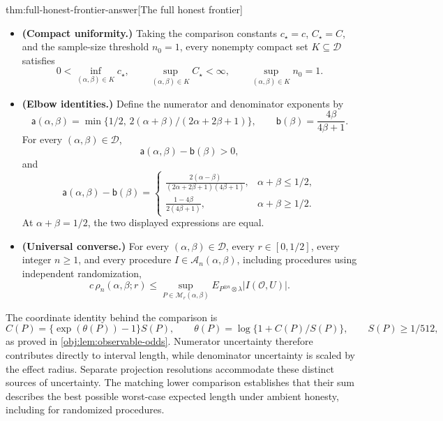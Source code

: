 \begin{theoremv}{thm:full-honest-frontier-answer}[The full honest frontier]
\begin{itemize}
\item \textbf{(Compact uniformity.)}
Taking the comparison constants \(c_\star=c\), \(C_\star=C\), and the sample-size threshold \(n_0=1\), every nonempty compact set \(K\subseteq\mathcal D\) satisfies
\[
0<\inf_{(\alpha,\beta)\in K}c_\star,\qquad
\sup_{(\alpha,\beta)\in K}C_\star<\infty,\qquad
\sup_{(\alpha,\beta)\in K}n_0=1.
\]

\item \textbf{(Elbow identities.)}
Define the numerator and denominator exponents by
\[
\mathsf a(\alpha,\beta)
=\min\{1/2,\,2(\alpha+\beta)/(2\alpha+2\beta+1)\},
\qquad
\mathsf b(\beta)=\frac{4\beta}{4\beta+1}.
\]
For every \((\alpha,\beta)\in\mathcal D\),
\[
\mathsf a(\alpha,\beta)-\mathsf b(\beta)>0,
\]
and
\[
\mathsf a(\alpha,\beta)-\mathsf b(\beta)
=
\begin{cases}
\displaystyle
\frac{2(\alpha-\beta)}
{(2\alpha+2\beta+1)(4\beta+1)},
&\alpha+\beta\le1/2,\\[6pt]
\displaystyle
\frac{1-4\beta}{2(4\beta+1)},
&\alpha+\beta\ge1/2.
\end{cases}
\]
At \(\alpha+\beta=1/2\), the two displayed expressions are equal.

\item \textbf{(Universal converse.)}
For every \((\alpha,\beta)\in\mathcal D\), every \(r\in[0,1/2]\), every integer \(n\ge1\), and every procedure \(I\in\mathcal A_n(\alpha,\beta)\), including procedures using independent randomization,
\[
c\,\rho_n(\alpha,\beta;r)
\le
\sup_{P\in\mathcal M_r(\alpha,\beta)}
E_{P^{\otimes n}\otimes\lambda}
\bigl|I(\mathcal O,U)\bigr|.
\]
\end{itemize}
\end{theoremv}

The coordinate identity behind the comparison is
\[
C(P)=\{\exp(\theta(P))-1\}S(P),
\qquad
\theta(P)=\log\{1+C(P)/S(P)\},
\qquad S(P)\ge1/512,
\]
as proved in \cref{obj:lem:observable-odds}. Numerator uncertainty therefore contributes directly to interval length, while denominator uncertainty is scaled by the effect radius. Separate projection resolutions accommodate these distinct sources of uncertainty. The matching lower comparison establishes that their sum describes the best possible worst-case expected length under ambient honesty, including for randomized procedures.

